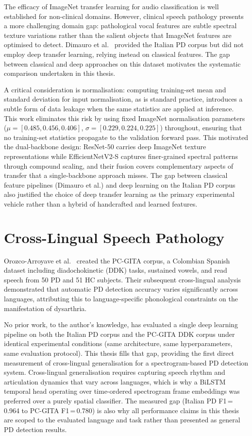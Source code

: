 \documentclass[oneside,openany]{final_report}
\begin{document}
The efficacy of ImageNet transfer learning for audio classification is well established for non-clinical domains. However, clinical speech pathology presents a more challenging domain gap: pathological vocal features are subtle spectral texture variations rather than the salient objects that ImageNet features are optimised to detect. Dimauro et al.~\cite{dimauro2019} provided the Italian PD corpus but did not employ deep transfer learning, relying instead on classical features. The gap between classical and deep approaches on this dataset motivates the systematic comparison undertaken in this thesis.

A critical consideration is normalisation: computing training-set mean and standard deviation for input normalisation, as is standard practice, introduces a subtle form of data leakage when the same statistics are applied at inference. This work eliminates this risk by using fixed ImageNet normalisation parameters ($\mu = [0.485, 0.456, 0.406]$, $\sigma = [0.229, 0.224, 0.225]$) throughout, ensuring that no training-set statistics propagate to the validation forward pass. This motivated the dual-backbone design: ResNet-50 carries deep ImageNet texture representations while EfficientNetV2-S captures finer-grained spectral patterns through compound scaling, and their fusion covers complementary aspects of transfer that a single-backbone approach misses. The gap between classical feature pipelines (Dimauro et al.) and deep learning on the Italian PD corpus also justified the choice of deep transfer learning as the primary experimental vehicle rather than a hybrid of handcrafted and learned features.

\section{Cross-Lingual Speech Pathology}

Orozco-Arroyave et al.~\cite{orozco2014} created the PC-GITA corpus, a Colombian Spanish dataset including diadochokinetic (DDK) tasks, sustained vowels, and read speech from 50 PD and 51 HC subjects. Their subsequent cross-lingual analysis~\cite{orozco2016} demonstrated that automatic PD detection accuracy varies significantly across languages, attributing this to language-specific phonological constraints on the manifestation of dysarthria.

No prior work, to the author's knowledge, has evaluated a single deep learning pipeline on both the Italian PD corpus and the PC-GITA DDK corpus under identical experimental conditions (same architecture, same hyperparameters, same evaluation protocol). This thesis fills that gap, providing the first direct measurement of cross-lingual generalisation for a spectrogram-based PD detection system. Cross-lingual generalisation requires capturing speech rhythm and articulation dynamics that vary across languages, which is why a BiLSTM temporal head operating over time-ordered spectrogram frame embeddings was preferred over a purely spatial classifier. The measured gap (Italian PD F1\,=\,0.964 to PC-GITA F1\,=\,0.780) is also why all performance claims in this thesis are scoped to the evaluated language and task rather than presented as general PD detection results.
\end{document}
